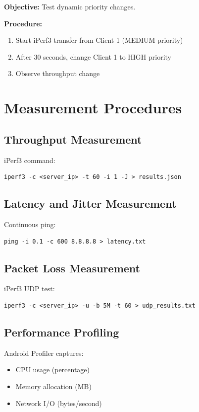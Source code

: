 \textbf{Objective:} Test dynamic priority changes.

\textbf{Procedure:}
\begin{enumerate}
    \item Start iPerf3 transfer from Client 1 (MEDIUM priority)
    \item After 30 seconds, change Client 1 to HIGH priority
    \item Observe throughput change
\end{enumerate}

\section{Measurement Procedures}

\subsection{Throughput Measurement}

iPerf3 command:
\begin{verbatim}
iperf3 -c <server_ip> -t 60 -i 1 -J > results.json
\end{verbatim}

\subsection{Latency and Jitter Measurement}

Continuous ping:
\begin{verbatim}
ping -i 0.1 -c 600 8.8.8.8 > latency.txt
\end{verbatim}

\subsection{Packet Loss Measurement}

iPerf3 UDP test:
\begin{verbatim}
iperf3 -c <server_ip> -u -b 5M -t 60 > udp_results.txt
\end{verbatim}

\subsection{Performance Profiling}

Android Profiler captures:
\begin{itemize}
    \item CPU usage (percentage)
    \item Memory allocation (MB)
    \item Network I/O (bytes/second)
\end{itemize}

